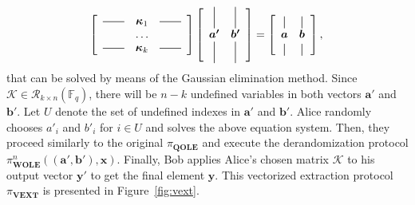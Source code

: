 \begin{equation*}
\left[
  \begin{array}{ccc}
    \bighorzbar & \bm{\kappa}_1 & \bighorzbar \\
    & \ldots & \\
    \bighorzbar & \bm{\kappa}_k & \bighorzbar \\
  \end{array}
\right] \left[
  \begin{array}{cc}
    \bigvertbar & \bigvertbar  \\
    \bm{a'} & \bm{b'} \\
    \bigvertbar  & \bigvertbar \\
  \end{array}
\right]  = \left[
  \begin{array}{cc}
    \vertbar & \vertbar\\
    \bm{a} & \bm{b}\\
    \vertbar & \vertbar\\
  \end{array}
\right],\\
\end{equation*}
that can be solved by means of the Gaussian elimination method. Since $\mathcal{K}\in \mathcal{R}_{k\times n}(\mathbb{F}_q)$, there will be $n-k$ undefined variables in both vectors $\bm{a}'$ and $\bm{b}'$. Let $U$ denote the set of undefined indexes in $\bm{a}'$ and $\bm{b}'$. Alice randomly chooses $a'_i$ and $b'_i$ for $i\in U$ and solves the above equation system. Then, they proceed similarly to the original $\pi_{\textbf{QOLE}}$ and execute the derandomization protocol $\pi^n_{\textbf{WOLE}}((\bm{a}',\bm{b}'), \bm{x})$. Finally, Bob applies Alice's chosen matrix $\mathcal{K}$ to his output vector $\bm{y}'$ to get the final element $\bm{y}$. This vectorized extraction protocol $\pi_{\textbf{VEXT}}$ is presented in Figure~\ref{fig:vext}. 



